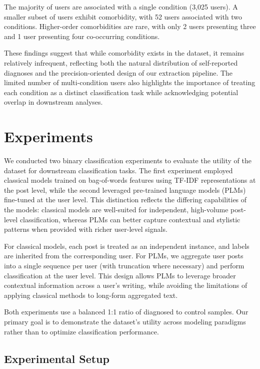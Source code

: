 \documentclass[11pt]{article}
\begin{document}
The majority of users are associated with a single condition (3,025 users). A smaller subset of users exhibit comorbidity, with 52 users associated with two conditions. Higher-order comorbidities are rare, with only 2 users presenting three and 1 user presenting four co-occurring conditions.

These findings suggest that while comorbidity exists in the dataset, it remains relatively infrequent, reflecting both the natural distribution of self-reported diagnoses and the precision-oriented design of our extraction pipeline. The limited number of multi-condition users also highlights the importance of treating each condition as a distinct classification task while acknowledging potential overlap in downstream analyses.

\section{Experiments}
\label{sec:experiments}

We conducted two binary classification experiments to evaluate the utility of the dataset for downstream classification tasks. The first experiment employed classical models trained on bag-of-words features using TF-IDF representations at the post level, while the second leveraged pre-trained language models (PLMs) fine-tuned at the user level. This distinction reflects the differing capabilities of the models: classical models are well-suited for independent, high-volume post-level classification, whereas PLMs can better capture contextual and stylistic patterns when provided with richer user-level signals.

For classical models, each post is treated as an independent instance, and labels are inherited from the corresponding user. For PLMs, we aggregate user posts into a single sequence per user (with truncation where necessary) and perform classification at the user level. This design allows PLMs to leverage broader contextual information across a user's writing, while avoiding the limitations of applying classical methods to long-form aggregated text.

Both experiments use a balanced 1:1 ratio of diagnosed to control samples. Our primary goal is to demonstrate the dataset's utility across modeling paradigms rather than to optimize classification performance.

\subsection{Experimental Setup}
\label{subsec:setup}
\end{document}
